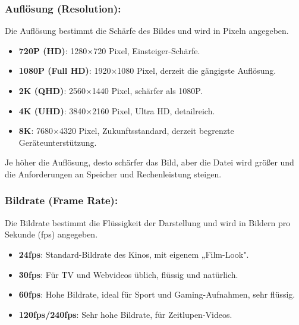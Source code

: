 


\subsubsection*{Auflösung (Resolution):}

Die Auflösung bestimmt die Schärfe des Bildes und wird in Pixeln angegeben.

\begin{itemize}
  \item \textbf{720P (HD)}: 1280×720 Pixel, Einsteiger-Schärfe.
  \item \textbf{1080P (Full HD)}: 1920×1080 Pixel, derzeit die gängigste Auflösung.
  \item \textbf{2K (QHD)}: 2560×1440 Pixel, schärfer als 1080P.
  \item \textbf{4K (UHD)}: 3840×2160 Pixel, Ultra HD, detailreich.
  \item \textbf{8K}: 7680×4320 Pixel, Zukunftsstandard, derzeit begrenzte Geräteunterstützung.
\end{itemize}

Je höher die Auflösung, desto schärfer das Bild, aber die Datei wird größer und die Anforderungen an Speicher und Rechenleistung steigen.

\subsubsection*{Bildrate (Frame Rate):}

Die Bildrate bestimmt die Flüssigkeit der Darstellung und wird in Bildern pro Sekunde (fps) angegeben.

\begin{itemize}
  \item \textbf{24fps}: Standard-Bildrate des Kinos, mit eigenem „Film-Look".
  \item \textbf{30fps}: Für TV und Webvideos üblich, flüssig und natürlich.
  \item \textbf{60fps}: Hohe Bildrate, ideal für Sport und Gaming-Aufnahmen, sehr flüssig.
  \item \textbf{120fps/240fps}: Sehr hohe Bildrate, für Zeitlupen-Videos.
\end{itemize}


